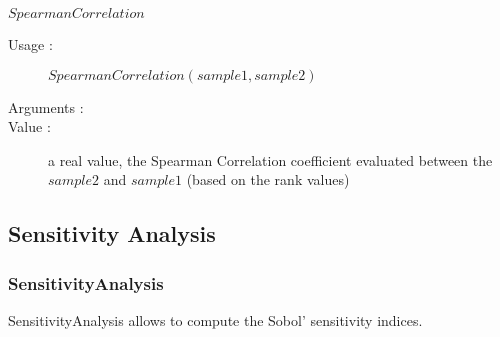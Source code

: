 \begin{description}
\begin{description}
  \item $SpearmanCorrelation$
    \begin{description}
    \item[Usage :] $SpearmanCorrelation(sample1, sample2)$
    \item[Arguments :] \rule{0pt}{1em}
    \item[Value :]  a real value, the Spearman Correlation coefficient evaluated between the $sample2$ and $sample1$ (based on the rank values)
    \end{description}
    \bigskip

  \end{description}
  
\end{description}



\newpage \subsection{Sensitivity Analysis}
\subsubsection{SensitivityAnalysis}

SensitivityAnalysis allows to compute the Sobol' sensitivity indices.

